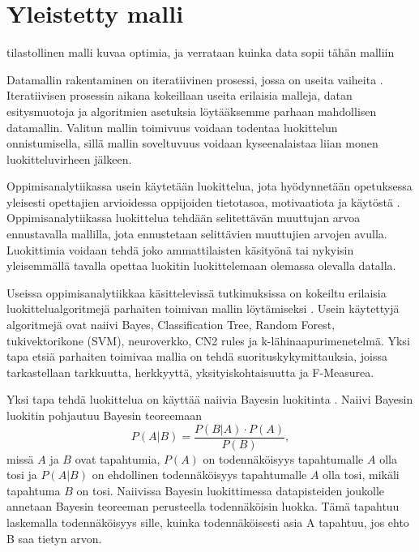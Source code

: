 \section{Yleistetty malli}
\color{red}
tilastollinen malli kuvaa optimia, ja verrataan kuinka data sopii tähän malliin
\color{black}

Datamallin rakentaminen on iteratiivinen prosessi, jossa on useita vaiheita \citep{hamalainenClassifiersEducationalData2010}. Iteratiivisen prosessin aikana kokeillaan useita erilaisia malleja, datan esitysmuotoja ja algoritmien asetuksia löytääksemme parhaan mahdollisen datamallin. Valitun mallin toimivuus voidaan todentaa luokittelun onnistumisella, sillä mallin soveltuvuus voidaan kyseenalaistaa liian monen luokitteluvirheen jälkeen.

Oppimisanalytiikassa usein käytetään luokittelua, jota hyödynnetään opetuksessa yleisesti opettajien arvioidessa oppijoiden tietotasoa, motivaatiota ja käytöstä \citep{hamalainenClassifiersEducationalData2010}. Oppimisanalytiikassa luokittelua tehdään selitettävän muuttujan arvoa ennustavalla mallilla, jota ennustetaan selittävien muuttujien arvojen avulla. Luokittimia voidaan tehdä joko ammattilaisten käsityönä tai nykyisin yleisemmällä tavalla opettaa luokitin luokittelemaan olemassa olevalla datalla.

Useissa oppimisanalytiikkaa käsittelevissä tutkimuksissa on kokeiltu erilaisia luokittelualgoritmejä parhaiten toimivan mallin löytämiseksi \citep{akcapinarUsingLearningAnalytics2019}. Usein käytettyjä algoritmejä ovat naiivi Bayes, Classification Tree, Random Forest, tukivektorikone (SVM), neuroverkko, CN2 rules ja k-lähinaapurimenetelmä. Yksi tapa etsiä parhaiten toimivaa mallia on tehdä suorituskykymittauksia, joissa tarkastellaan tarkkuutta, herkkyyttä, yksityiskohtaisuutta ja F-Measurea.

Yksi tapa tehdä luokittelua on käyttää naiivia Bayesin luokitinta \citep{natinggaDataScienceAlgorithms2018}. Naiivi Bayesin luokitin pohjautuu Bayesin teoreemaan $$P(A | B) = \frac{P(B | A) \cdot P(A)}{P(B)},$$ missä $A$ ja $B$ ovat tapahtumia, $P(A)$ on todennäköisyys tapahtumalle $A$ olla tosi ja $P(A | B)$ on ehdollinen todennäköisyys tapahtumalle $A$ olla tosi, mikäli tapahtuma $B$ on tosi. Naiivissa Bayesin luokittimessa datapisteiden joukolle annetaan Bayesin teoreeman perusteella todennäköisin luokka. Tämä tapahtuu laskemalla todennäköisyys sille, kuinka todennäköisesti asia A tapahtuu, jos ehto B saa tietyn arvon.

